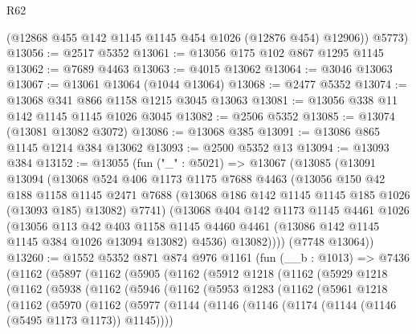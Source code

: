 \begin{lexlean}{R62}
\begin{coremodule}
        (@12868 @455 @142 @1145 @1145 @454 @1026 (@12876 @454) @12906))
      @5773)
@13056 := @2517 @5352
@13061 := @13056 @175 @102 @867 @1295 @1145
@13062 := @7689 @4463
@13063 := @4015 @13062
@13064 := @3046 @13063
@13067 := @13061 @13064 (@1044 @13064)
@13068 := @2477 @5352
@13074 := @13068 @341 @866 @1158 @1215 @3045 @13063
@13081 := @13056 @338 @11 @142 @1145 @1145 @1026 @3045
@13082 := @2506 @5352
@13085 := @13074 (@13081 @13082 @3072)
@13086 := @13068 @385
@13091 := @13086 @865 @1145 @1214 @384 @13062
@13093 := @2500 @5352 @13
@13094 := @13093 @384
@13152 := @13055
    (fun ("_" : @5021) =>
    @13067
      (@13085
        (@13091
          @13094
          (@13068
            @524
            @406
            @1173
            @1175
            @7688
            @4463
            (@13056
              @150
              @42
              @188
              @1158
              @1145
              @2471
              @7688
              (@13068 @186 @142 @1145 @1145 @185 @1026 (@13093 @185) @13082)
              @7741)
            (@13068
              @404
              @142
              @1173
              @1145
              @4461
              @1026
              (@13056
                @113
                @42
                @403
                @1158
                @1145
                @4460
                @4461
                (@13086 @142 @1145 @1145 @384 @1026 @13094 @13082)
                @4536)
              @13082))))
      (@7748 @13064))
@13260 := @1552
    @5352
    @871
    @874
    @976
    @1161
    (fun (__b : @1013) =>
    @7436
      (@1162
        (@5897
          (@1162
            (@5905
              (@1162
                (@5912
                  @1218
                  (@1162
                    (@5929
                      @1218
                      (@1162
                        (@5938
                          (@1162
                            (@5946
                              (@1162
                                (@5953
                                  @1283
                                  (@1162
                                    (@5961
                                      @1218
                                      (@1162
                                        (@5970
                                          (@1162
                                            (@5977
                                              (@1144
                                                (@1146
                                                  (@1146
                                                    (@1174
                                                      (@1144 (@1146 (@5495 @1173 @1173)) @1145))))

\end{coremodule}
\end{lexlean}

